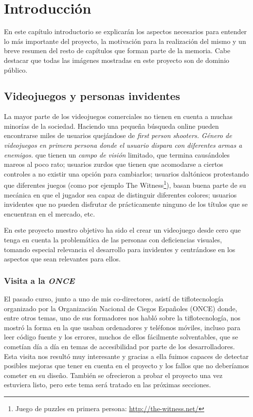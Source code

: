 \chapter[Introdución]{Introducción}

En este capítulo introductorio se explicarán los aspectos necesarios para entender lo más importante del proyecto, la motivación para la realización del mismo y un breve resumen del resto de capítulos que forman parte de la memoria.
Cabe destacar que todas las imágenes mostradas en este proyecto son de dominio público.

\section{Videojuegos y personas invidentes}
La mayor parte de los videojuegos comerciales no tienen en cuenta a muchas minorías de la sociedad. Haciendo una pequeña búsqueda online pueden encontrarse miles de usuarios quejándose de \textit{first person shooters. Género de videojuegos en primera persona donde el usuario dispara con diferentes armas a enemigos.} que tienen un \textit{campo de visión} limitado, que termina causándoles mareos al poco rato; usuarios zurdos que tienen que acomodarse a ciertos controles a no existir una opción para cambiarlos; usuarios daltónicos protestando que diferentes juegos (como por ejemplo The Witness\footnote{Juego de puzzles en primera persona: \url{http://the-witness.net/}}), basan buena parte de su mecánica en que el jugador sea capaz de distinguir diferentes colores; usuarios invidentes que no pueden disfrutar de prácticamente ninguno de los títulos que se encuentran en el mercado, etc.

En este proyecto nuestro objetivo ha sido el crear un videojuego desde cero que tenga en cuenta la problemática de las personas con deficiencias visuales, tomando especial relevancia el desarrollo para invidentes y centrándose en los aspectos que sean relevantes para ellos.

\subsection{Visita a la \textit{ONCE}}
El pasado curso, junto a uno de mis co-directores, asistí de tiflotecnología organizado por la Organización Nacional de Ciegos Españoles (ONCE) donde, entre otros temas, uno de sus formadores nos habló sobre la tiflotecnología, nos mostró la forma en la que usaban ordenadores y teléfonos móviles, incluso para leer código fuente y los errores, muchos de ellos fácilmente solventables, que se cometían día a día en temas de accesibilidad por parte de los desarrolladores. Esta visita nos resultó muy interesante y gracias a ella fuimos capaces de detectar posibles mejoras que tener en cuenta en el proyecto y los fallos que no deberíamos cometer en su diseño. También se ofrecieron a probar el proyecto una vez estuviera listo, pero este tema será tratado en las próximas secciones.

